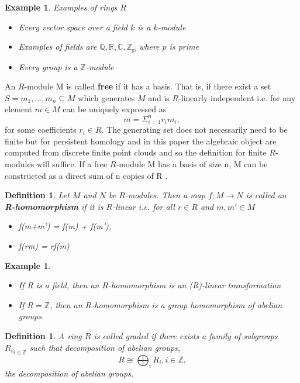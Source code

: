 \documentclass{article}
\newcommand{\be}{\begin{equation}}
\newcommand{\ee}{\end{equation}}
\newtheorem{definition}[theorem]{Definition}
\newtheorem{example}[theorem]{Example}
\begin{document}
\begin{example}Examples of rings $R$
\begin{itemize}
    \item Every vector space over a field $k$ is a $k$-module
    \item Examples of fields are $\mathbb{Q}, \mathbb{R}, \mathbb{C}, \mathbb{Z_p}$ where $p$ is prime
    \item Every group is a $\mathbb{Z}$-module
\end{itemize}
\end{example}
An $R$-module M is called \textbf{free} if it has a basis. That is, if there exist a set $S = {m_1, ..., m_n} \subseteq M$ which generates $M$ and is $R$-linearly independent i.e. for any element $m \in M$ can be uniquely expressed as
\be
m = \Sigma ^{n}_{i=1} r_i m_i ,
\ee
for some coefficients $r_i \in R$. The generating set does not necessarily need to be finite but for persistent homology and in this paper the algebraic object are computed from discrete finite point clouds and so the definition for finite $R$-modules will suffice. If a free $R$-module M has a basis of size n, M can be constructed as a direct sum of n copies of R \cite{HSchenckAlgebraicFound}. 

\begin{definition}
Let $M$ and $N$ be $R$-modules. Then a map $f: M \to N$ is called an \textbf{R-homomorphism} if it is $R$-linear i.e. for all $r \in R$ and $m,m' \in M$
\begin{itemize}
    \item f(m+m') = f(m) + f(m'),
    \item f(rm) = rf(m)
\end{itemize}
\end{definition}

\begin{example}
    \begin{itemize}
        \item If R is a field, then an $R$-homomorphism is an (R)-linear transformation
        \item If $R = \mathbb{Z}$, then an $R$-homomorphism is a group homomorphism of abelian groups.
    \end{itemize}
\end{example}
\begin{definition}A ring $R$ is called graded if there exists a family of subgroups ${R_i}_{i\in \mathbb{Z}}$ such that
decomposition of abelian groups,
\be
R \cong \bigoplus_{i}R_{i}, i\in\mathbb{Z}.
\ee the decomposition of abelian groups.
\end{definition}
\end{document}
